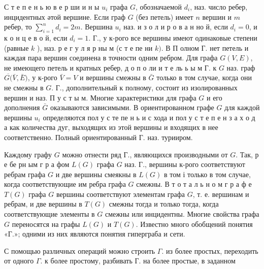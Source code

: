 \documentclass[10pt]{article}
\begin{document}
С т е п е н ь ю в е р ши и н ы $u_{i}$ графа $G$, обозначаемой $d_{i}$, наз. число ребер, инцидентных әтой вершине. Если граф $G$ (без петель) имеет $n$ вершин и $m$ ребер, то $\sum_{i=1}^{n} d_{i}=2 m$. Вершина $u_{i}$ наз. и з о л и р о в а н но й, если $d_{i}=0$, и к о н ц е в о й, если $d_{i}=1$. Г., у к-рого все вершины имеют одинаковые степени (равные $k$ ), наз. р е г у л я р ны м (с т е пе ни $k)$. В П олном Г. нет петель и каждая пара вершин соединена в точности одним ребром. Для графа $G(V, E)$, не имеющего петель и кратных ребер, д о п о ли и т е ль ь ы м Г. к $G$ наз. граф $\overline{G(} \bar{V}, \bar{E})$, у к-рого $\bar{V}=V$ и вершины смежны в $\bar{G}$ только в том случае, когда они не смежны в $G$. Г., дополнительный к полному, состоит из изолированных вершин и наз. П у с т ы м. Многие характеристики для графа $G$ и его дополнения $\bar{G}$ оказываются зависимыми. В ориентированном графе $G$ для каждой вершины $u_{i}$ определяются пол у с те пе н ь и с хода и пол у с т е п е н з а х о д а как количества дуг, выходящих из этой вершины и входящих в нее соответственно. Полный ориентированный Г. наз. турииром.



Каждому графу $G$ можно отнести ряд Г., являющихся производными от $G$. Так, р е бе рн ым г р а фом $L(G)$ графа $G$ наз. Г., вершины к-рого соответствуют ребрам графа $G$ и две вершины смеякны в $L(G)$ в том і только в том случае, когда соответствующие им ребра графа $G$ смежны. В т о т а л ь н о м г р а ф е $T(G)$ графа $G$ вершины соответствуют элементам графа $G$, т. е. вершинам и ребрам, и две вершины в $T(G)$ смежны тогда и только тогда, когда соответствующие элементы в $G$ смежны или инцидентны. Многие свойства графа $G$ переносятся на графы $L(G)$ и $T(G)$. Известно много обобщений понятия «Г.»; одними из них являются понятия гиперграба и сети.



С помощью различных операций можно строить $\Gamma$. из более простых, переходить от одного $\Gamma$. к более простому, разбивать Г. на более простые, в заданном
\end{document}
